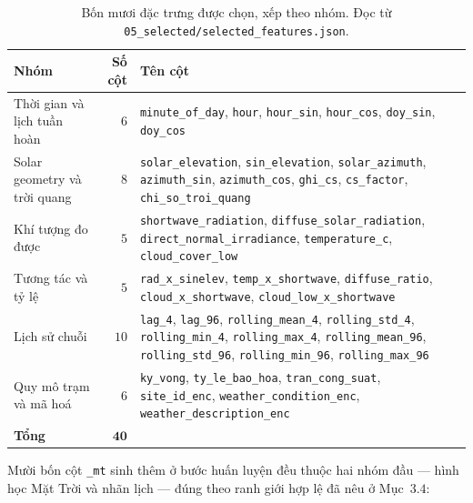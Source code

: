 \documentclass[12pt, a4paper]{report}
\begin{document}
\begin{table}[htbp]
\centering
\caption{Bốn mươi đặc trưng được chọn, xếp theo nhóm. Đọc từ
\texttt{05\_selected/selected\_features.json}.}
\label{tab:bo_dac_trung}
\small
\begin{tabular}{@{}L{4.0cm} r L{9.0cm}@{}}
\toprule
\textbf{Nhóm} & \textbf{Số cột} & \textbf{Tên cột} \\
\midrule
Thời gian và lịch tuần hoàn & $6$ &
\texttt{minute\_of\_day}, \texttt{hour}, \texttt{hour\_sin}, \texttt{hour\_cos},
\texttt{doy\_sin}, \texttt{doy\_cos} \\
\addlinespace
Solar geometry và trời quang & $8$ &
\texttt{solar\_elevation}, \texttt{sin\_elevation}, \texttt{solar\_azimuth},
\texttt{azimuth\_sin}, \texttt{azimuth\_cos}, \texttt{ghi\_cs}, \texttt{cs\_factor},
\texttt{chi\_so\_troi\_quang} \\
\addlinespace
Khí tượng đo được & $5$ &
\texttt{shortwave\_radiation}, \texttt{diffuse\_solar\_radiation},
\texttt{direct\_normal\_irradiance}, \texttt{temperature\_c}, \texttt{cloud\_cover\_low} \\
\addlinespace
Tương tác và tỷ lệ & $5$ &
\texttt{rad\_x\_sinelev}, \texttt{temp\_x\_shortwave}, \texttt{diffuse\_ratio},
\texttt{cloud\_x\_shortwave}, \texttt{cloud\_low\_x\_shortwave} \\
\addlinespace
Lịch sử chuỗi & $10$ &
\texttt{lag\_4}, \texttt{lag\_96}, \texttt{rolling\_mean\_4}, \texttt{rolling\_std\_4},
\texttt{rolling\_min\_4}, \texttt{rolling\_max\_4}, \texttt{rolling\_mean\_96},
\texttt{rolling\_std\_96}, \texttt{rolling\_min\_96}, \texttt{rolling\_max\_96} \\
\addlinespace
Quy mô trạm và mã hoá & $6$ &
\texttt{ky\_vong}, \texttt{ty\_le\_bao\_hoa}, \texttt{tran\_cong\_suat}, \texttt{site\_id\_enc},
\texttt{weather\_condition\_enc}, \texttt{weather\_description\_enc} \\
\midrule
\textbf{Tổng} & $\mathbf{40}$ & \\
\bottomrule
\end{tabular}
\end{table}

\enlargethispage{3\baselineskip}
Mười bốn cột \texttt{\_mt} sinh thêm ở bước huấn luyện đều thuộc hai nhóm đầu --- hình học Mặt Trời
và nhãn lịch --- đúng theo ranh giới hợp lệ đã nêu ở Mục~$3.4$:
\end{document}
